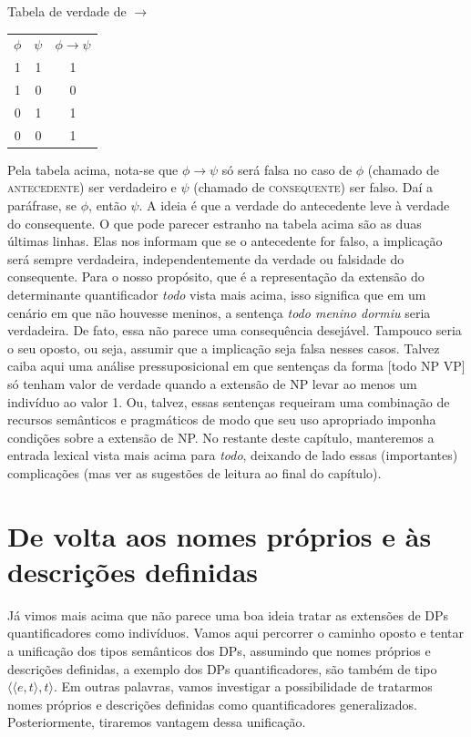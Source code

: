 \begin{exe}
	\ex Tabela de verdade de $\rightarrow$\\

\begin{tabular}{c|c|c}
	$\phi$ & $\psi$ & $\phi \rightarrow \psi$ \\ 
	1 & 1 & 1 \\ 
	1 & 0 & 0 \\ 
	0 & 1 & 1 \\ 
	0 & 0 & 1 \\ 
\end{tabular}	
	 	
\end{exe}

\n Pela tabela acima, nota-se que $\phi \rightarrow \psi$ só será falsa no caso de $\phi$ (chamado de \textsc{antecedente}) ser verdadeiro e $\psi$ (chamado de \textsc{consequente}) ser falso. Daí a paráfrase, se $\phi$, então $\psi$. A ideia é que a verdade do antecedente leve à verdade do consequente. O que pode parecer estranho na tabela acima são as duas últimas linhas. Elas nos informam que se o antecedente for falso, a implicação será sempre verdadeira, independentemente da verdade ou falsidade do consequente. Para o nosso propósito, que é a representação da extensão do determinante quantificador \textit{todo} vista mais acima, isso significa que em um cenário em que não houvesse meninos, a sentença \textit{todo menino dormiu} seria verdadeira. De fato, essa não parece uma consequência desejável. Tampouco seria o seu oposto, ou seja, assumir que a implicação seja falsa nesses casos. Talvez caiba aqui uma análise pressuposicional em que sentenças da forma [todo NP VP] só tenham valor de verdade quando a extensão de NP levar ao menos um indivíduo ao valor 1. Ou, talvez, essas sentenças requeiram uma combinação de recursos semânticos e pragmáticos de modo que seu uso apropriado imponha condições sobre a extensão de NP. No restante deste capítulo, manteremos a entrada lexical vista mais acima para \textit{todo}, deixando de lado essas (importantes) complicações (mas ver as sugestões de leitura ao final do capítulo). 

\section{De volta aos nomes próprios e às descrições definidas}

Já vimos mais acima que não parece uma boa ideia tratar as
extensões de DPs quantificadores como indivíduos. Vamos aqui percorrer o caminho oposto e tentar a unificação dos tipos semânticos
dos DPs, assumindo que nomes próprios e descrições definidas, a
exemplo dos DPs quantificadores, são também de tipo
$\langle\langle e,t\rangle,t\rangle$. Em outras palavras, vamos investigar a
possibilidade de tratarmos nomes próprios e descrições definidas
como quantificadores generalizados. Posteriormente, tiraremos vantagem dessa unificação.

